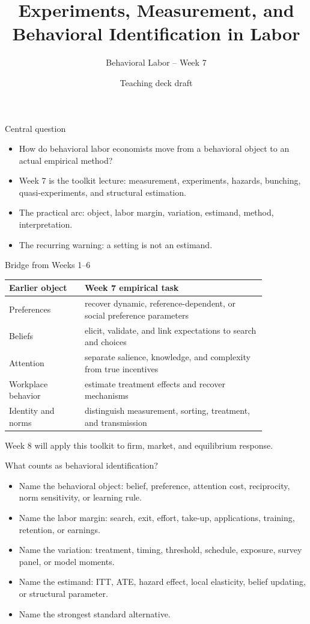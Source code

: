 \documentclass[aspectratio=169,11pt]{beamer}
\title{Experiments, Measurement, and Behavioral Identification in Labor}
\subtitle{Behavioral Labor -- Week 7}
\author{Teaching deck draft}
\date{}
\begin{document}
\begin{frame}
  \titlepage
\end{frame}

\begin{frame}{Central question}
\begin{itemize}
    \item How do behavioral labor economists move from a behavioral object to an actual empirical method?
    \item Week 7 is the toolkit lecture: measurement, experiments, hazards, bunching, quasi-experiments, and structural estimation.
    \item The practical arc: object, labor margin, variation, estimand, method, interpretation.
    \item The recurring warning: a setting is not an estimand.
\end{itemize}
\end{frame}

\begin{frame}{Bridge from Weeks 1--6}
\small
\begin{tabular}{p{0.25\linewidth} p{0.60\linewidth}}
\toprule
Earlier object & Week 7 empirical task \\
\midrule
Preferences & recover dynamic, reference-dependent, or social preference parameters \\
Beliefs & elicit, validate, and link expectations to search and choices \\
Attention & separate salience, knowledge, and complexity from true incentives \\
Workplace behavior & estimate treatment effects and recover mechanisms \\
Identity and norms & distinguish measurement, sorting, treatment, and transmission \\
\bottomrule
\end{tabular}

\vspace{0.7em}
Week 8 will apply this toolkit to firm, market, and equilibrium response.
\end{frame}

\begin{frame}{What counts as behavioral identification?}
\begin{itemize}
    \item Name the behavioral object: belief, preference, attention cost, reciprocity, norm sensitivity, or learning rule.
    \item Name the labor margin: search, exit, effort, take-up, applications, training, retention, or earnings.
    \item Name the variation: treatment, timing, threshold, schedule, exposure, survey panel, or model moments.
    \item Name the estimand: ITT, ATE, hazard effect, local elasticity, belief updating, or structural parameter.
    \item Name the strongest standard alternative.
\end{itemize}
\end{frame}
\end{document}
